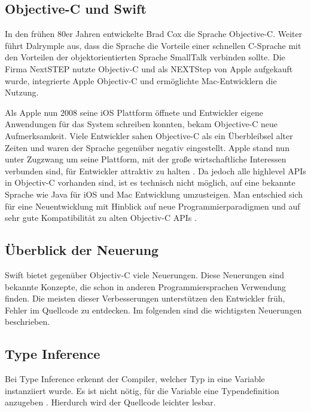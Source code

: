 \subsection{Objective-C und Swift}
In den frühen 80er Jahren entwickelte Brad Cox die Sprache Objective-C\cite{Dalrymple:2009aa}. Weiter führt Dalrymple aus, dass die Sprache  die Vorteile einer schnellen C-Sprache mit den Vorteilen der objektorientierten Sprache SmallTalk verbinden sollte. Die Firma NextSTEP nutzte Objectiv-C und als NEXTStep von Apple aufgekauft wurde, integrierte Apple Objectiv-C und ermöglichte Mac-Entwicklern die Nutzung.

 Als Apple nun 2008 seine iOS Plattform öffnete und Entwickler eigene Anwendungen für das System schreiben konnten, bekam Objective-C neue Aufmerksamkeit. Viele Entwickler sahen Objective-C als ein Überbleibsel alter Zeiten und waren der Sprache gegenüber negativ eingestellt. Apple stand nun unter Zugzwang um seine Plattform, mit der große wirtschaftliche Interessen verbunden sind, für Entwickler attraktiv zu halten \cite{Wells:2015fu}. Da jedoch alle highlevel APIs in Objectiv-C vorhanden sind, ist es technisch nicht möglich, auf eine bekannte Sprache wie Java für iOS und Mac Entwicklung umzusteigen. Man entschied sich für eine Neuentwicklung mit Hinblick auf neue Programmierparadigmen und auf sehr gute Kompatibilität zu alten Objectiv-C APIs \cite{Wells:2015fu}.

\subsection{Überblick der Neuerung}
Swift bietet gegenüber Objectiv-C viele Neuerungen. Diese Neuerungen sind bekannte Konzepte, die schon in anderen Programmiersprachen Verwendung finden. Die meisten dieser Verbesserungen unterstützen den Entwickler früh, Fehler im Quellcode zu entdecken. Im folgenden sind die wichtigsten Neuerungen beschrieben.

\subsection*{Type Inference}
Bei Type Inference erkennt der Compiler, welcher Typ in eine Variable instanziiert wurde. Es ist nicht nötig, für die Variable eine Typendefinition anzugeben \cite{Apple:2014sp}. Hierdurch wird der Quellcode leichter lesbar. 


